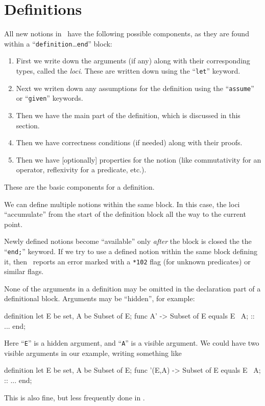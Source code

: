 \section{Definitions}

\begin{node}\label{mizar-000J}%
All new notions in \Mizar\ have the following possible components, as
they are found within a ``\texttt{definition}\dots\texttt{end}'' block:
\begin{enumerate}
\item First we write down the arguments (if any) along with their
  corresponding types, called the \textit{loci}. These are written down
  using the ``\texttt{let}'' keyword.
\item Next we writen down any assumptions for the definition using the
  ``\texttt{assume}'' or ``\texttt{given}'' keywords.
\item Then we have the main part of the definition, which is discussed
  in this section.
\item Then we have correctness conditions (if needed) along with their proofs.
\item Then we have [optionally] properties for the notion (like
  commutativity for an operator, reflexivity for a predicate, etc.).
\end{enumerate}
These are the basic components for a definition.

\begin{node}\label{mizar-000K}%
We can define multiple notions within the same block. In this case, the
loci ``accumulate'' from the start of the definition block all the way
to the current point.
\end{node}

\begin{node}\label{mizar-000L}%
Newly defined notions become ``available'' only \emph{after} the block
is closed the the ``\texttt{end;}'' keyword. If we try to use a defined
notion within the same block defining it, then \Mizar\ reports an error
marked with a \texttt{*102} flag (for unknown predicates) or similar flags.
\end{node}

\begin{node}\label{mizar-000M}%
None of the arguments in a definition may be omitted in the declaration
part of a definitional block. Arguments may be ``hidden'', for example:
\begin{mizar}
definition
  let E be set, A be Subset of E;
  func A' -> Subset of E equals
  E \ A;
  :: ...
end;
\end{mizar}
Here ``\texttt{E}'' is a hidden argument, and ``\texttt{A}'' is a
visible argument. We could have two visible arguments in our example,
writing something like
\begin{mizar}
definition
  let E be set, A be Subset of E;
  func '(E,A) -> Subset of E equals
  E \ A;
  :: ...
end;
\end{mizar}
This is also fine, but less frequently done in \Mizar.


\end{node}
\end{node}
